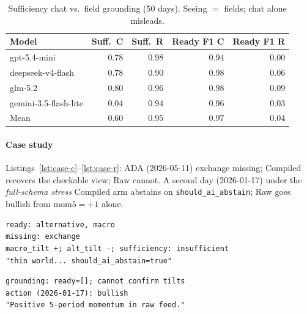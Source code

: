 \documentclass[sigconf,anonymous]{acmart}
\theoremstyle{acmdefinition}%
\theoremstyle{acmplain}%
\begin{document}
\begin{table}[t]
  \caption{Sufficiency chat vs.\ field grounding ($50$ days). Seeing $=$ fields; chat alone misleads.}
  \label{tab:suff}
  \small
  \begin{tabular}{lrrrr}
    \toprule
    Model & Suff.\ C & Suff.\ R & Ready F1 C & Ready F1 R \\
    \midrule
    gpt-5.4-mini & $0.78$ & $0.98$ & $0.94$ & $0.00$ \\
    deepseek-v4-flash & $0.78$ & $0.90$ & $0.98$ & $0.06$ \\
    glm-5.2 & $0.80$ & $0.96$ & $0.98$ & $0.09$ \\
    gemini-3.5-flash-lite & $0.04$ & $0.94$ & $0.96$ & $0.03$ \\
    \midrule
    Mean & $0.60$ & $0.95$ & $0.97$ & $0.04$ \\
    \bottomrule
  \end{tabular}
\end{table}

\paragraph{Case study}
Listings~\ref{lst:case-c}--\ref{lst:case-r}: ADA (2026-05-11) exchange missing; Compiled recovers the checkable view; Raw cannot.
A second day (2026-01-17) under the \emph{full-schema stress} Compiled arm abstains on \texttt{should\_ai\_abstain}; Raw goes bullish from \(\mathrm{mom5}=+1\) alone.

\begin{lstlisting}[caption={Compiled grounding (gpt-5.4-mini, ADA 2026-05-11).},label={lst:case-c}]
ready: alternative, macro
missing: exchange
macro_tilt +; alt_tilt -; sufficiency: insufficient
"thin world... should_ai_abstain=true"
\end{lstlisting}

\begin{lstlisting}[caption={Raw grounding / action (same model family).},label={lst:case-r}]
grounding: ready=[]; cannot confirm tilts
action (2026-01-17): bullish
"Positive 5-period momentum in raw feed."
\end{lstlisting}
\end{document}
